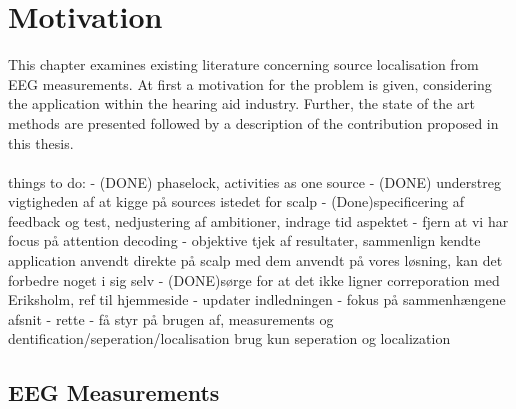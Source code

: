 \chapter{Motivation}\label{ch:motivation}
This chapter examines existing literature concerning source localisation from EEG measurements. At first a motivation for the problem is given, considering the application within the hearing aid industry. Further, the state of the art methods are presented followed by a description of the contribution proposed in this thesis. \\
\\
things to do: 
- (DONE) phaselock, activities as one source
- (DONE) understreg vigtigheden af at kigge på sources istedet for scalp
- (Done)specificering af feedback og test, nedjustering af ambitioner, indrage tid aspektet
- fjern at vi har focus på attention decoding 
- objektive tjek af resultater, sammenlign kendte application anvendt direkte på scalp med dem anvendt på vores løsning, kan det forbedre noget i sig selv 
- (DONE)sørge for at det ikke ligner correporation med Eriksholm, ref til hjemmeside 
- updater indledningen
- fokus på sammenhængene afsnit 
- rette 
- få styr på brugen af, measurements og dentification/seperation/localisation
brug kun seperation og localization  

\section{EEG Measurements}

